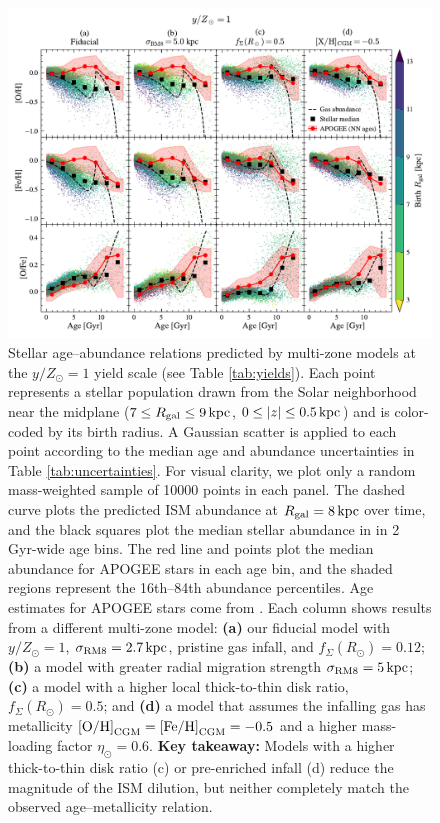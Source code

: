 \documentclass[twocolumn,twocolappendix,linenumbers]{aastex631}
\newcommand{\mathOH}{{\rm [O/H]}}
\newcommand{\mathFeH}{{\rm [Fe/H]}}
\newcommand{\yZ}[1]{$y/Z_\odot=#1$}
\newcommand{\kpc}{\,{\rm kpc}}
\begin{document}
\begin{figure}
    \centering
    \includegraphics[width=\linewidth]{figures/stellar_abundance_evolution.pdf}
    \caption{Stellar age--abundance relations predicted by multi-zone models at the \yZ{1} yield scale (see Table \ref{tab:yields}). Each point represents a stellar population drawn from the Solar neighborhood near the midplane ($7\leq R_{\rm gal}\leq 9\kpc$, $0\leq |z| \leq 0.5\kpc$) and is color-coded by its birth radius. A Gaussian scatter is applied to each point according to the median age and abundance uncertainties in Table \ref{tab:uncertainties}. For visual clarity, we plot only a random mass-weighted sample of \num{10000} points in each panel. The dashed curve plots the predicted ISM abundance at $R_{\rm gal}=8\kpc$ over time, and the black squares plot the median stellar abundance in in {2 Gyr}-wide age bins. The red line and points plot the median abundance for APOGEE stars in each age bin, and the shaded regions represent the 16th--84th abundance percentiles. Age estimates for APOGEE stars come from \citet{leung_variational_2023}.
    Each column shows results from a different multi-zone model: {\bf (a)} our fiducial model with $y/Z_\odot=1$, $\sigma_{\rm RM8}=2.7\kpc$, pristine gas infall, and $f_\Sigma(R_\odot)=0.12$; {\bf (b)} a model with greater radial migration strength $\sigma_{\rm RM8}=5\kpc$; {\bf (c)} a model with a higher local thick-to-thin disk ratio, $f_\Sigma(R_\odot)=0.5$; and {\bf (d)} a model that assumes the infalling gas has metallicity $\mathOH_{\rm CGM}=\mathFeH_{\rm CGM}=-0.5$ and a higher mass-loading factor $\eta_\odot=0.6$. {\bf Key takeaway:} Models with a higher thick-to-thin disk ratio (c) or pre-enriched infall (d) reduce the magnitude of the ISM dilution, but neither completely match the observed age--metallicity relation.}
    \label{fig:abundance-evolution-params}
\end{figure}
\end{document}
